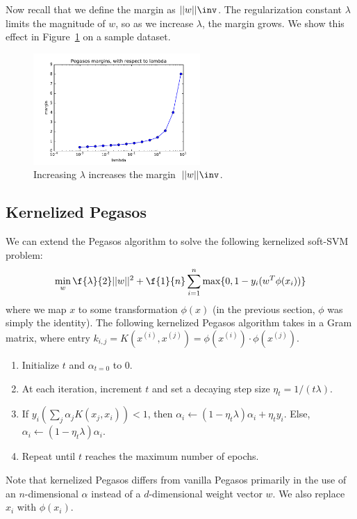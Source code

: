 \documentclass{article}
\begin{document}
\begin{multicols}{2}
Now recall that we define the margin as $||w||\inv$.
The regularization constant $\lambda$ limits the magnitude of $w$,
so as we increase $\lambda$, the margin grows.
We show this effect in Figure~\ref{fig:3-2-margins} on a sample dataset.

\begin{figure}[t]
   \centering
	\includegraphics[width=2.5in]{img/3-2-margins.pdf}
   \caption{Increasing $\lambda$ increases the margin~$||w||\inv$.}
   \label{fig:3-2-margins}
\end{figure}

\subsection{Kernelized Pegasos}
\label{subsec:kernel-peg}

We can extend the Pegasos algorithm
to solve the following kernelized soft-SVM problem:
\begin{equation}
   \min_w{\f{\lambda}{2}||w||^2} + \f{1}{n}\sum_{i=1}^n{\max\{0,1-y_i(w^T\phi(x_i))\}}
\end{equation}
where we map $x$ to some transformation $\phi(x)$
(in the previous section, $\phi$ was simply the identity).
The following kernelized Pegasos algorithm takes in a Gram matrix, 
where entry $k_{i,j} = K(x^{(i)},x^{(j)}) = \phi(x^{(i)})\cdot\phi(x^{(j)})$.
\begin{enumerate}
    \item
    Initialize $t$ and $\alpha_{t=0}$ to 0.
    \item
    At each iteration, increment $t$
    and set a decaying step size $\eta_t = 1/(t\lambda)$.
    \item
    If $y_i(\sum_j{\alpha_jK(x_j,x_i)})<1$,
    then $\alpha_{i}\leftarrow(1-\eta_t\lambda)\alpha_i+\eta_ty_i$.
    Else, $\alpha_{i}\leftarrow(1-\eta_t\lambda)\alpha_i$.
    \item
    Repeat until $t$ reaches the maximum number of epochs.
\end{enumerate}
Note that kernelized Pegasos differs from vanilla Pegasos
primarily in the use of an $n$-dimensional $\alpha$
instead of a $d$-dimensional weight vector $w$.
We also replace $x_i$ with $\phi(x_i)$.


\end{multicols}
\end{document}
